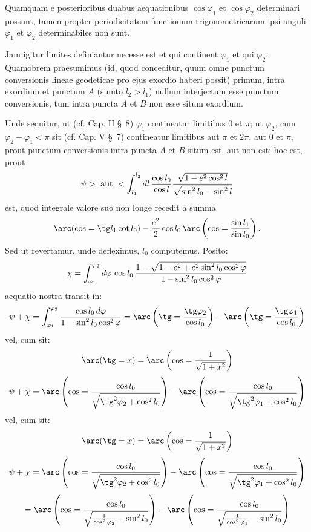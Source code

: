 \begingroup\small
Quamquam e posterioribus duabus aequationibus $\cos\varphi_1$ et $\cos\varphi_2$ determinari possunt, tamen propter periodicitatem functionum trigonometricarum ipsi anguli $\varphi_1$ et $\varphi_2$ determinabiles non sunt.

Jam igitur limites definiantur necesse est et qui continent $\varphi_1$ et qui $\varphi_2$. Quamobrem praesumimus (id, quod conceditur, quum omne punctum conversionis lineae geodeticae pro ejus exordio haberi possit) primum, intra exordium et punctum $A$ (sumto $l_2>l_1$) nullum interjectum esse punctum conversionis, tum intra puncta $A$ et $B$ non esse situm exordium.

Unde sequitur, ut (cf. Cap. II \S\ 8) $\varphi_1$ contineatur limitibus $0$ et $\pi$; ut $\varphi_2$, cum $\varphi_2-\varphi_1<\pi$ sit (cf. Cap. V \S\ 7) contineatur limitibus aut $\pi$ et $2\pi$, aut $0$ et $\pi$, prout punctum conversionis intra puncta $A$ et $B$ situm est, aut non est; hoc est, prout
\[
 \psi >\text{ aut }<\int_{l_1}^{l_2} dl\,{\cos l_0\over\cos l}{\sqrt{1-e^2\cos^2l}\over \sqrt{\sin^2l_0-\sin^2l}}
\]
est, quod integrale valore suo non longe recedit a summa
\[
 \arc(\cos=\tg l_1\cot l_0)-{e^2\over2}\cos l_0\,\arc\left(\cos={\sin l_1\over\sin l_0}\right).
\]
Sed ut revertamur, unde defleximus, $l_0$ computemus.
Posito:
\[
 \chi=\int_{\varphi_1}^{\varphi_2} d\varphi\,\cos l_0\,{1-\sqrt{1-e^2+e^2\sin^2l_0\cos^2\varphi}\over 1-\sin^2l_0\cos^2\varphi}
\]
aequatio nostra transit in:
\[
 \psi+\chi=\int_{\varphi_1}^{\varphi_2}{\cos l_0\,d\varphi\over1-\sin^2l_0\cos^2\varphi}
 =\arc\left(\tg={\tg\varphi_2\over\cos l_0}\right)-\arc\left(\tg={\tg\varphi_1\over\cos l_0}\right)
\]
vel, cum sit:
\[
 \arc(\tg=x)=\arc\left(\cos={1\over\sqrt{1+x^2}}\right)
\]
\[
 \psi+\chi=\arc\left(\cos={\cos l_0\over\sqrt{\tg^2\varphi_2+\cos^2l_0}}\right)-\arc\left(\cos={\cos l_0\over\sqrt{\tg^2\varphi_1+\cos^2l_0}}\right)
\]
vel, cum sit:
\[
 \arc(\tg=x)=\arc\left(\cos={1\over\sqrt{1+x^2}}\right)
\]
\[
 \psi+\chi=\arc\left(\cos={\cos l_0\over\sqrt{\tg^2\varphi_2+\cos^2l_0}}\right)-\arc\left(\cos={\cos l_0\over\sqrt{\tg^2\varphi_1+\cos^2l_0}}\right)
\]
\[
=\arc\left(\cos={\cos l_0\over\sqrt{{1\over\cos^2\varphi_2}-\sin^2l_0}}\right)-\arc\left(\cos={\cos l_0\over\sqrt{{1\over\cos^2\varphi_1}-\sin^2l_0}}\right)
\]
\endgroup
